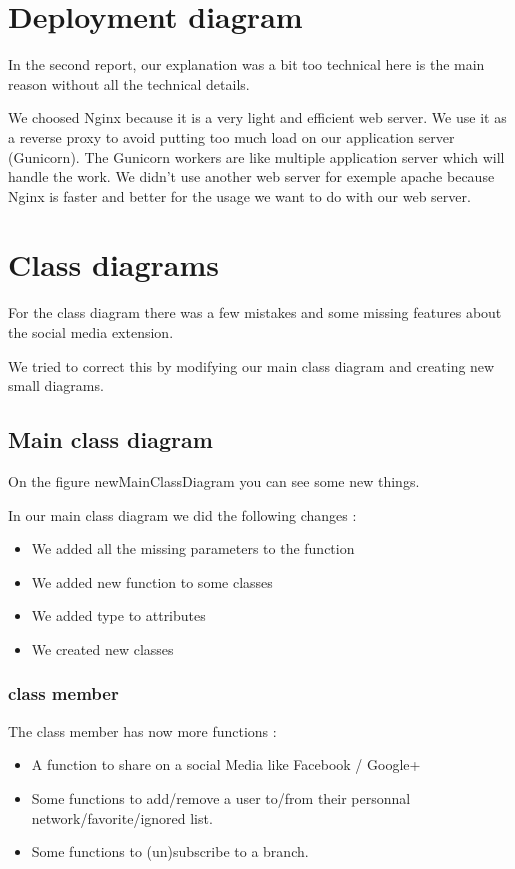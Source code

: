 \documentclass[11pt, a4paper]{article}   	%
\begin{document}
\section{Deployment diagram}

In the second report, our explanation was a bit too technical here is the main reason without all the technical details.

We choosed Nginx because it is a very light and efficient web server. We use it as a reverse proxy to avoid putting too much load on our application server (Gunicorn). The Gunicorn workers are like multiple application server which will handle the work. We didn't use another web server for exemple apache because Nginx is faster and better for the usage we want to do with our web server.

\section{Class diagrams}

For the class diagram there was a few mistakes and some missing features about the social media extension. 

We tried to correct this by modifying our main class diagram and creating new small diagrams.


\subsection{Main class diagram}


On the figure {newMainClassDiagram} you can see some new things.

In our main class diagram we did the following changes :

\begin{itemize}
\item We added all the missing parameters to the function
\item We added new function to some classes 
\item We added type to attributes
\item We created new classes 
\end{itemize}

\subsubsection{class member}

The class member has now more functions :
\begin{itemize}
\item A function to share on a social Media like Facebook / Google+
\item Some functions to add/remove a user to/from their personnal network/favorite/ignored list.
\item Some functions to (un)subscribe to a branch.
\end{itemize}
\end{document}
